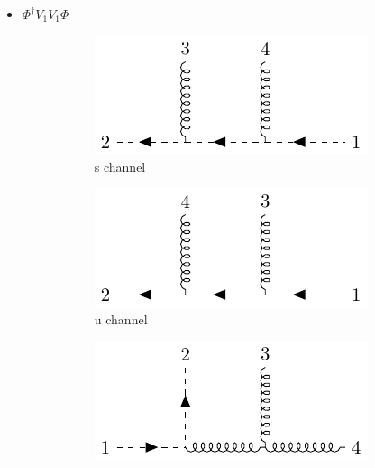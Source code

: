 \documentclass{beamer}
\begin{document}
\begin{frame}
    \begin{itemize}
        \item $\Phi^\dagger V_1V_1\Phi$
        \begin{figure}
            \centering
            \begin{subfigure}{0.3\textwidth}
              \includegraphics[width=\linewidth]{sch.pdf}
              \caption{s channel}
            \end{subfigure}
            \hfill
            \begin{subfigure}{0.3\textwidth}
              \includegraphics[width=\linewidth]{uch.pdf}
              \caption{u channel}
            \end{subfigure}
            \hfill
            \begin{subfigure}{0.3\textwidth}
              \includegraphics[width=\linewidth]{tch.pdf}

\end{subfigure}
\end{figure}
\end{itemize}
\end{frame}
\end{document}
